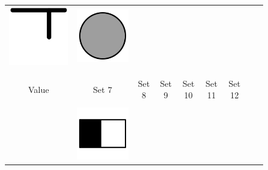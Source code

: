 \documentclass[doc]{apa6}
\newcommand{\stimulusscale}{.1}
\begin{document}
\begin{figure}[p]
\begin{center}
\begin{tabular}{c|cccccccc}
\includegraphics[scale=\stimulusscale]{./set5stim75.png} &
\includegraphics[scale=\stimulusscale]{./set6stim75.png} \\
\multicolumn{1}{c}{}\\
\multicolumn{1}{c}{}\\
Value & Set 7 & Set 8 & Set 9 & Set 10 & Set 11 & Set 12 \\[6pt] \hline
\\
 \raisebox{.75cm}{55}  &
\includegraphics[scale=\stimulusscale]{./set7stim55.png} &

\end{tabular}
\end{center}
\end{figure}
\end{document}
